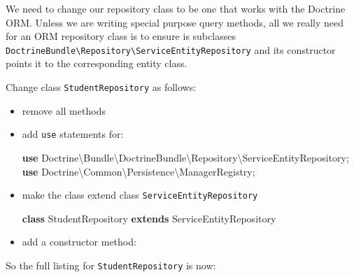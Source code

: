 \documentclass[a4paperpaper,openright]{book}
\newenvironment{Shaded}{}{}
\newcommand{\FunctionTok}[1]{\textcolor[rgb]{0.02,0.16,0.49}{#1}}
\newcommand{\KeywordTok}[1]{\textcolor[rgb]{0.00,0.44,0.13}{\textbf{#1}}}
\newcommand{\NormalTok}[1]{#1}
\newcommand{\OtherTok}[1]{\textcolor[rgb]{0.00,0.44,0.13}{#1}}
\begin{document}
We need to change our repository class to be one that works with the
Doctrine ORM. Unless we are writing special purpose query methods, all
we really need for an ORM repository class is to ensure is subclasses
\texttt{DoctrineBundle\textbackslash{}Repository\textbackslash{}ServiceEntityRepository}
and its constructor points it to the corresponding entity class.

Change class \texttt{StudentRepository} as follows:

\begin{itemize}
\item
  remove all methods
\item
  add \texttt{use} statements for:

\begin{Shaded}
\begin{Highlighting}[]
    \KeywordTok{use}\NormalTok{ Doctrine\textbackslash{}Bundle\textbackslash{}DoctrineBundle\textbackslash{}Repository\textbackslash{}ServiceEntityRepository}\OtherTok{;}
    \KeywordTok{use}\NormalTok{ Doctrine\textbackslash{}Common\textbackslash{}Persistence\textbackslash{}ManagerRegistry}\OtherTok{;}      
\end{Highlighting}
\end{Shaded}
\item
  make the class extend class \texttt{ServiceEntityRepository}

\begin{Shaded}
\begin{Highlighting}[]
    \KeywordTok{class}\NormalTok{ StudentRepository }\KeywordTok{extends}\NormalTok{ ServiceEntityRepository}
\end{Highlighting}
\end{Shaded}
\item
  add a constructor method:

\begin{Shaded}
\end{Shaded}
\end{itemize}

So the full listing for \texttt{StudentRepository} is now:
\end{document}

